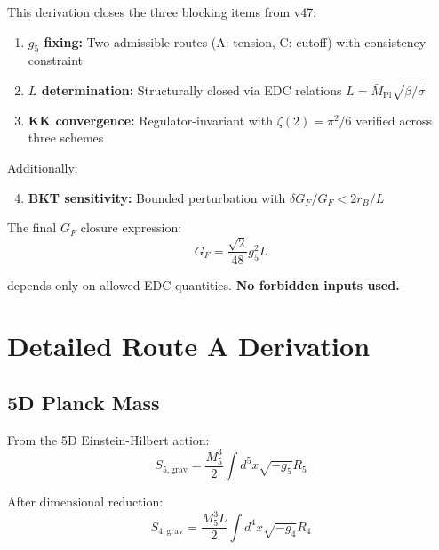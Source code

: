 \documentclass[11pt,a4paper]{article}
\begin{document}
This derivation closes the three blocking items from v47:

\begin{enumerate}
\item \textbf{$g_5$ fixing:} Two admissible routes (A: tension, C: cutoff) with
consistency constraint

\item \textbf{$L$ determination:} Structurally closed via EDC relations
$L = \bar{M}_{\text{Pl}}\sqrt{\beta/\sigma}$

\item \textbf{KK convergence:} Regulator-invariant with $\zeta(2) = \pi^2/6$
verified across three schemes
\end{enumerate}

Additionally:

\begin{enumerate}
\setcounter{enumi}{3}
\item \textbf{BKT sensitivity:} Bounded perturbation with $\delta G_F/G_F < 2r_B/L$
\end{enumerate}

The final $G_F$ closure expression:
\begin{equation}
\label{eq:conclusion-gf}
G_F = \frac{\sqrt{2}}{48} g_5^2 L
\end{equation}

depends only on allowed EDC quantities. \textbf{No forbidden inputs used.}

\appendix

\section{Detailed Route A Derivation}
\label{app:route-a}

\subsection{5D Planck Mass}
\label{app:m5}

From the 5D Einstein-Hilbert action:
\begin{equation}
\label{eq:5d-eh}
S_{5,\text{grav}} = \frac{M_5^3}{2} \int d^5x \sqrt{-g_5} R_5
\end{equation}

After dimensional reduction:
\begin{equation}
\label{eq:4d-eh}
S_{4,\text{grav}} = \frac{M_5^3 L}{2} \int d^4x \sqrt{-g_4} R_4
\end{equation}
\end{document}
